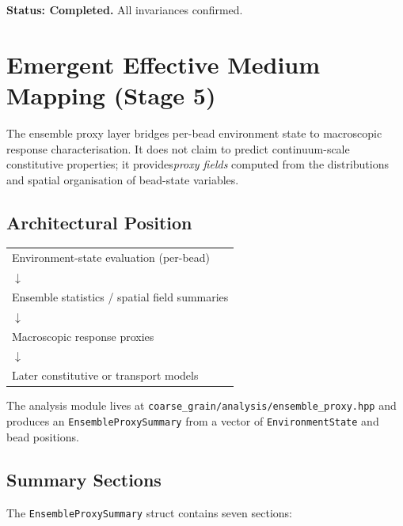 \documentclass[11pt]{article}
\newcommand{\file}[1]{\texttt{#1}}
\begin{document}
\textbf{Status: Completed.} All invariances confirmed.

\section{Emergent Effective Medium Mapping (Stage 5)}
\label{sec:eem}

The ensemble proxy layer bridges per-bead environment state to
macroscopic response characterisation.  It does not claim to predict
continuum-scale constitutive properties; it provides\emph{proxy fields}
computed from the distributions and spatial organisation of bead-state
variables.

\subsection{Architectural Position}

\begin{center}
\begin{tabular}{l}
    Environment-state evaluation (per-bead) \\
    $\downarrow$ \\
    Ensemble statistics / spatial field summaries \\
    $\downarrow$ \\
    Macroscopic response proxies \\
    $\downarrow$ \\
    Later constitutive or transport models \\
\end{tabular}
\end{center}

The analysis module lives at \file{coarse\_grain/analysis/ensemble\_proxy.hpp}
and produces an \texttt{EnsembleProxySummary} from a vector of
\texttt{EnvironmentState} and bead positions.

\subsection{Summary Sections}

The \texttt{EnsembleProxySummary} struct contains seven sections:
\end{document}
